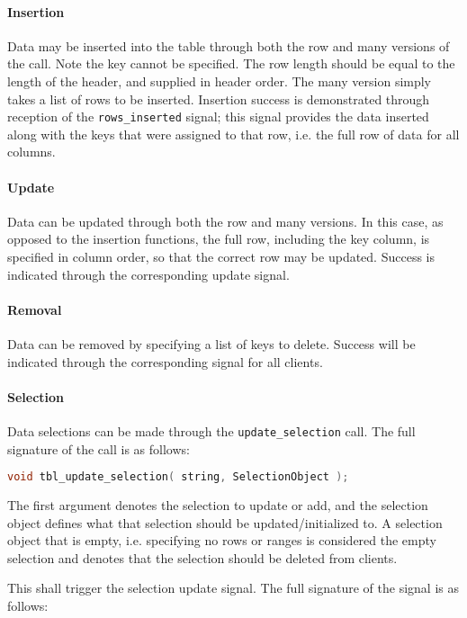 \documentclass[11pt, oneside]{amsart}
\begin{document}
\paragraph{\textbf{Insertion}} Data may be inserted into the table through both the row and many versions of the call. Note the key cannot be specified. The row length should be equal to the length of the header, and supplied in header order. The many version simply takes a list of rows to be inserted. Insertion success is demonstrated through reception of the \texttt{rows\_inserted} signal; this signal provides the data inserted along with the keys that were assigned to that row, i.e. the full row of data for all columns.

\paragraph{\textbf{Update}} Data can be updated through both the row and many versions. In this case, as opposed to the insertion functions, the full row, including the key column, is specified in column order, so that the correct row may be updated. Success is indicated through the corresponding update signal.

\paragraph{\textbf{Removal}} Data can be removed by specifying a list of keys to delete. Success will be indicated through the corresponding signal for all clients.

\paragraph{\textbf{Selection}} Data selections can be made through the \texttt{update\_selection} call. The full signature of the call is as follows:

\begin{lstlisting}[language=c++]
	void tbl_update_selection( string, SelectionObject );
\end{lstlisting}

The first argument denotes the selection to update or add, and the selection object defines what that selection should be updated/initialized to. A selection object that is empty, i.e. specifying no rows or ranges is considered the empty selection and denotes that the selection should be deleted from clients.

This shall trigger the selection update signal. The full signature of the signal is as follows:
\end{document}
